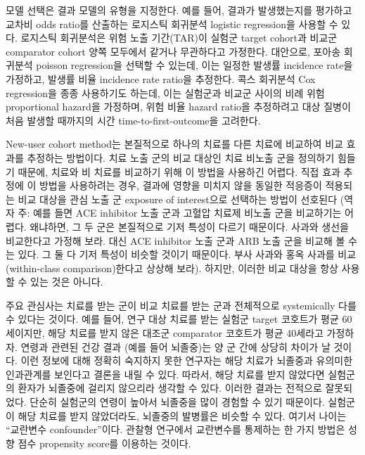 \documentclass[10.5pt]{book}
\theoremstyle{definition}
\theoremstyle{definition}
\theoremstyle{definition}
\theoremstyle{remark}
\let\BeginKnitrBlock\begin \let\EndKnitrBlock\end
\begin{document}
모델 선택은 결과 모델의 유형을 지정한다. 예를 들어, 결과가 발생했는지를
평가하고 교차비 odds ratio를 산출하는 로지스틱 회귀분석 logistic
regression을 사용할 수 있다. 로지스틱 회귀분석은 위험 노출 기간(TAR)이
실험군 target cohort과 비교군 comparator cohort 양쪽 모두에서 같거나
무관하다고 가정한다. 대안으로, 포아송 회귀분석 poisson regression을
선택할 수 있는데, 이는 일정한 발생률 incidence rate을 가정하고, 발생률
비율 incidence rate ratio을 추정한다. 콕스 회귀분석 Cox regression을
종종 사용하기도 하는데, 이는 실험군과 비교군 사이의 비례 위험
proportional hazard을 가정하며, 위험 비율 hazard ratio을 추정하려고 대상
질병이 처음 발생할 때까지의 시간 time-to-first-outcome을 고려한다.
 

\BeginKnitrBlock{rmdimportant}
New-user cohort method는 본질적으로 하나의 치료를 다른 치료에 비교하여
비교 효과를 추정하는 방법이다. 치료 노출 군의 비교 대상인 치료 비노출
군을 정의하기 힘들기 때문에, 치료와 비 치료를 비교하기 위해 이 방법을
사용하긴 어렵다. 직접 효과 추정에 이 방법을 사용하려는 경우, 결과에
영향을 미치지 않을 동일한 적응증이 적용되는 비교 대상을 관심 노출 군
exposure of interest으로 선택하는 방법이 선호된다 (역자 주: 예를 들면
ACE inhibitor 노출 군과 고혈압 치료제 비노출 군을 비교하기는 어렵다.
왜냐하면, 그 두 군은 본질적으로 기저 특성이 다르기 때문이다. 사과와
생선을 비교한다고 가정해 보라. 대신 ACE inhibitor 노출 군과 ARB 노출
군을 비교해 볼 수는 있다. 그 둘 다 기저 특성이 비슷할 것이기 때문이다.
부사 사과와 홍옥 사과를 비교 (within-class comparison)한다고 상상해
보라). 하지만, 이러한 비교 대상을 항상 사용할 수 있는 것은 아니다.
\EndKnitrBlock{rmdimportant}

주요 관심사는 치료를 받는 군이 비교 치료를 받는 군과 전체적으로
systemically 다를 수 있다는 것이다. 예를 들어, 연구 대상 치료를 받는
실험군 target 코호트가 평균 60세이지만, 해당 치료를 받지 않은 대조군
comparator 코호트가 평균 40세라고 가정하자. 연령과 관련된 건강 결과
(예를 들어 뇌졸중)는 양 군 간에 상당히 차이가 날 것이다. 이런 정보에
대해 정확히 숙지하지 못한 연구자는 해당 치료가 뇌졸중과 유의미한
인과관계를 보인다고 결론을 내릴 수 있다. 따라서, 해당 치료를 받지
않았다면 실험군의 환자가 뇌졸중에 걸리지 않으리라 생각할 수 있다. 이러한
결과는 전적으로 잘못되었다. 단순히 실험군의 연령이 높아서 뇌졸중을 많이
경험할 수 있기 때문이다. 실험군이 해당 치료를 받지 않았더라도, 뇌졸중의
발병률은 비슷할 수 있다. 여기서 나이는 ``교란변수 confounder''이다.
관찰형 연구에서 교란변수를 통제하는 한 가지 방법은 성향 점수 propensity
score를 이용하는 것이다. 
\end{document}

